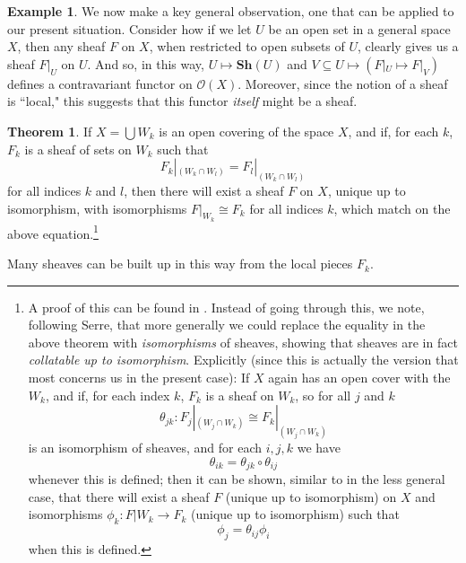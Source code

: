 \documentclass[11pt]{book}
\theoremstyle{definition}
\newtheorem{example}{Example}[section]
\theoremstyle{definition}
\theoremstyle{definition}
\newtheorem{theorem}{Theorem}[section]
\theoremstyle{theorem}
\theoremstyle{definition}
\begin{document}
\begin{example}
		We now make a key general observation, one that can be applied to our present situation. Consider how if we let $U$ be an open set in a general space $X$, then any sheaf $F$ on $X$, when restricted to open subsets of $U$, clearly gives us a sheaf $F|_{U}$ on $U$. And so, in this way, $U \mapsto \textbf{Sh}(U)$ and $V \subseteq U \mapsto (F|_U \mapsto F|_V)$ defines a contravariant functor on $\mathscr{O}(X)$. Moreover, since the notion of a sheaf is ``local," this suggests that this functor \textit{itself} might be a sheaf.
		\begin{theorem}
			\label{sheafcollation} 
			If $X = \bigcup W_k$ is an open covering of the space $X$, and if, for each $k$, $F_k$ is a sheaf of sets on $W_k$ such that 
			\begin{equation}
			F_k|_{(W_k \cap W_l)} = F_l|_{(W_k \cap W_l)}
			\end{equation} 
			for all indices $k$ and $l$, then there will exist a sheaf $F$ on $X$, unique up to isomorphism, with isomorphisms $F|_{W_k} \cong F_k$ for all indices $k$, which match on the above equation.\footnote{A proof of this can be found in \cite{maclane_sheaves_1994}. Instead of going through this, we note, following Serre, that more generally we could replace the equality in the above theorem with \textit{isomorphisms} of sheaves, showing that sheaves are in fact \textit{collatable up to isomorphism}. Explicitly (since this is actually the version that most concerns us in the present case): If $X$ again has an open cover with the $W_k$, and if, for each index $k$, $F_k$ is a sheaf on $W_k$, so for all $j$ and $k$ 
				\begin{equation}
				\theta_{jk}: F_j|_{(W_j \cap W_k)} \cong F_k|_{(W_j \cap W_k)}
				\end{equation} 
				is an isomorphism of sheaves, and for each $i, j, k$ we have 
				\begin{equation*}
				\theta_{ik} = \theta_{jk} \circ \theta_{ij}
				\end{equation*}
				whenever this is defined; then it can be shown, similar to in the less general case, that there will exist a sheaf $F$ (unique up to isomorphism) on $X$ and isomorphisms $\phi_k: F|{W_k} \rightarrow F_k$ (unique up to isomorphism) such that 
				\begin{equation*}
				\phi_j = \theta_{ij} \phi_i
				\end{equation*}
				 when this is defined.}  
		\end{theorem} \noindent 
		Many sheaves can be built up in this way from the local pieces $F_k$. \par \noindent 

\end{example}
\end{document}
